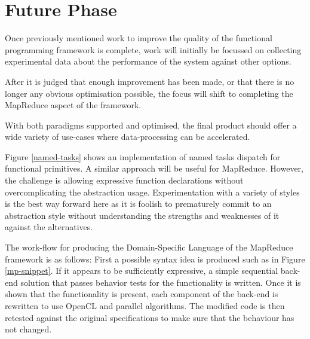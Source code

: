 \section{Future Phase}
Once previously mentioned work to improve the quality of the functional programming framework is complete, work will initially be focussed on collecting experimental data about the performance of the system against other options.


After it is judged that enough improvement has been made, or that there is no longer any obvious optimisation possible, the focus will shift to completing the MapReduce aspect of the framework.


With both paradigms supported and optimised, the final product should offer a wide variety of use-cases where data-processing can be accelerated.


Figure \ref{named-tasks} shows an implementation of named tasks dispatch for functional primitives. A similar approach will be useful for MapReduce. However, the challenge is allowing expressive function declarations without overcomplicating the abstraction usage. Experimentation with a variety of styles is the best way forward here as it is foolish to prematurely commit to an abstraction style without understanding the strengths and weaknesses of it against the alternatives.

The work-flow for producing the Domain-Specific Language of the MapReduce framework is as follows:
First a possible syntax idea is produced such as in Figure \ref{mp-snippet}. If it appears to be sufficiently expressive, a simple sequential back-end solution that passes behavior tests for the functionality is written. Once it is shown that the functionality is present, each component of the back-end is rewritten to use OpenCL and parallel algorithms. The modified code is then retested against the original specifications to make sure that the behaviour has not changed.
